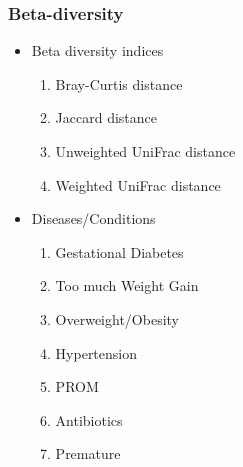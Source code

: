 \documentclass{beamer}
\begin{document}
    \begin{frame}
        \frametitle{Beta-diversity}

        \begin{itemize}
            \item Beta diversity indices
            \begin{enumerate}
                \item Bray-Curtis distance
                \item Jaccard distance
                \item Unweighted UniFrac distance
                \item Weighted UniFrac distance
            \end{enumerate}

            \item Diseases/Conditions
            \begin{enumerate}
                \item Gestational Diabetes
                \item Too much Weight Gain
                \item Overweight/Obesity
                \item Hypertension
                \item PROM
                \item Antibiotics
                \item Premature
            \end{enumerate}
        \end{itemize}
    \end{frame}
\end{document}

